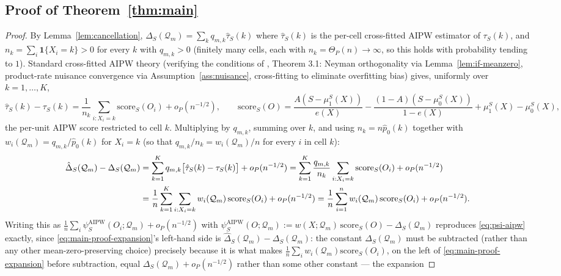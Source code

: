 \documentclass[11pt]{article}
\theoremstyle{plain}
\theoremstyle{definition}
\theoremstyle{remark}
\newcommand{\Q}{\mathcal{Q}}
\begin{document}
\subsection{Proof of Theorem~\ref{thm:main}}\label{app:proof-main}

\begin{proof}
By Lemma~\ref{lem:cancellation}, $\hat\Delta_S(\Q_m)=\sum_kq_{m,k}\hat\tau_S(k)$ where
$\hat\tau_S(k)$ is the per-cell cross-fitted AIPW estimator of $\tau_S(k)$, and
$n_k=\sum_i\mathbf1\{X_i=k\}>0$ for every $k$ with $q_{m,k}>0$ (finitely many cells,
each with $n_k=\Theta_P(n)\to\infty$, so this holds with probability tending to $1$).
Standard cross-fitted AIPW theory (verifying the conditions of
\citealp{chernozhukov2018}, Theorem 3.1: Neyman orthogonality via
Lemma~\ref{lem:if-meanzero}, product-rate nuisance convergence via
Assumption~\ref{ass:nuisance}, cross-fitting to eliminate overfitting bias) gives,
uniformly over $k=1,\dots,K$,
\[
    \hat\tau_S(k)-\tau_S(k) = \frac1{n_k}\sum_{i:X_i=k}\mathrm{score}_S(O_i) + o_P(n^{-1/2}),
    \qquad \mathrm{score}_S(O)=\frac{A(S-\mu_1^S(X))}{e(X)}-\frac{(1-A)(S-\mu_0^S(X))}{1-e(X)}+\mu_1^S(X)-\mu_0^S(X),
\]
the per-unit AIPW score restricted to cell $k$. Multiplying by $q_{m,k}$, summing over
$k$, and using $n_k=n\hat p_0(k)$ together with $w_i(\Q_m)=q_{m,k}/\hat p_0(k)$ for
$X_i=k$ (so that $q_{m,k}/n_k = w_i(\Q_m)/n$ for every $i$ in cell $k$):
\begin{align}
    \hat\Delta_S(\Q_m)-\Delta_S(\Q_m)
    &= \sum_{k=1}^K q_{m,k}\big[\hat\tau_S(k)-\tau_S(k)\big] + o_P(n^{-1/2})
    = \sum_{k=1}^K \frac{q_{m,k}}{n_k}\sum_{i:X_i=k}\mathrm{score}_S(O_i) + o_P(n^{-1/2})\notag\\
    &= \frac1n\sum_{k=1}^K\sum_{i:X_i=k} w_i(\Q_m)\,\mathrm{score}_S(O_i) + o_P(n^{-1/2})
    = \frac1n\sum_{i=1}^n w_i(\Q_m)\,\mathrm{score}_S(O_i) + o_P(n^{-1/2}).
    \label{eq:main-proof-expansion}
\end{align}
Writing this as $\frac1n\sum_i\psi_S^{\mathrm{AIPW}}(O_i;\Q_m)+o_P(n^{-1/2})$ with
$\psi_S^{\mathrm{AIPW}}(O;\Q_m):=w(X;\Q_m)\,\mathrm{score}_S(O)-\Delta_S(\Q_m)$
reproduces \eqref{eq:psi-aipw} exactly, since \eqref{eq:main-proof-expansion}'s
left-hand side is $\hat\Delta_S(\Q_m)-\Delta_S(\Q_m)$: the constant $\Delta_S(\Q_m)$
must be subtracted (rather than any other mean-zero-preserving choice) precisely
because it is what makes $\frac1n\sum_iw_i(\Q_m)\mathrm{score}_S(O_i)$, on the
left of \eqref{eq:main-proof-expansion} before subtraction, equal
$\Delta_S(\Q_m)+o_P(n^{-1/2})$ rather than some other constant --- the expansion

\end{proof}
\end{document}
